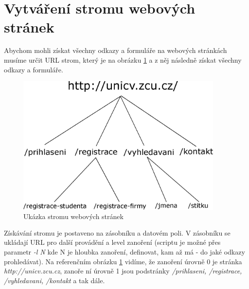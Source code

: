 \documentclass[12pt, a4paper]{report}
\begin{document}
\section{Vytváření stromu webových stránek}
Abychom mohli získat všechny odkazy a formuláře na webových stránkách musíme určit URL strom, který je na obrázku \ref{obr.url_tree} a z něj následně získat všechny odkazy a formuláře.
\begin{figure}[h!]
\includegraphics[width=390px]{url_tree.eps}
\caption{Ukázka stromu webových stránek}
\label{obr.url_tree}
\end{figure}
Získávání stromu je postaveno na zásobníku a datovém poli. V zásobníku se ukládají URL pro další provádění a level zanoření (scriptu je možné přes parametr \textit{-l N} kde N je hloubka zanoření, definovat, kam až má - do jaké  odkazy prohledávat). Na referenčním obrázku \ref{obr.url_tree} vidíme, že zanoření úrovně 0 je stránka \textit{http://unicv.zcu.cz}, zanoře ní úrovně 1 jsou podstránky \textit{/prihlaseni, /registrace, /vyhledavani, /kontakt} a tak dále.
\end{document}
